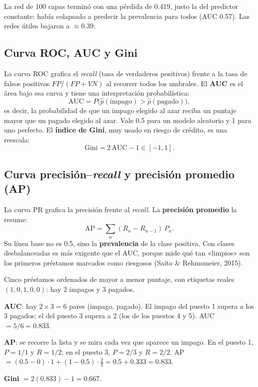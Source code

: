 \documentclass[11pt,a4paper]{article}
\begin{document}
\begin{proyecto}
La red de 100 capas terminó con una pérdida de 0.419, justo la del predictor constante: había colapsado a predecir la prevalencia para todos (AUC 0.57). Las redes útiles bajaron a $\approx 0.39$.
\end{proyecto}

\subsection{Curva ROC, AUC y Gini}

La curva ROC grafica el \textit{recall} (tasa de verdaderos positivos) frente a la tasa de falsos positivos $FP/(FP+VN)$ al recorrer todos los umbrales. El \textbf{AUC} es el área bajo esa curva y tiene una interpretación probabilística:
\begin{equation}
\text{AUC} = P\big(\hat p(\text{impago}) > \hat p(\text{pagado})\big),
\end{equation}
es decir, la probabilidad de que un impago elegido al azar reciba un puntaje mayor que un pagado elegido al azar. Vale 0.5 para un modelo aleatorio y 1 para uno perfecto. El \textbf{índice de Gini}, muy usado en riesgo de crédito, es una reescala:
\begin{equation}
\text{Gini} = 2\,\text{AUC} - 1 \in [-1, 1].
\end{equation}

\subsection{Curva precisión--\textit{recall} y precisión promedio (AP)}

La curva PR grafica la precisión frente al \textit{recall}. La \textbf{precisión promedio} la resume:
\begin{equation}
\text{AP} = \sum_n (R_n - R_{n-1})\,P_n .
\end{equation}
Su línea base no es 0.5, sino la \textbf{prevalencia} de la clase positiva. Con clases desbalanceadas es más exigente que el AUC, porque mide qué tan «limpios» son los primeros préstamos marcados como riesgosos (Saito \& Rehmsmeier, 2015).

\begin{ejemplo}
Cinco préstamos ordenados de mayor a menor puntaje, con etiquetas reales $(1,0,1,0,0)$: hay 2 impagos y 3 pagados.

\textbf{AUC}: hay $2\times3=6$ pares (impago, pagado). El impago del puesto 1 supera a los 3 pagados; el del puesto 3 supera a 2 (los de los puestos 4 y 5). AUC $=5/6=0.833$.

\textbf{AP}: se recorre la lista y se mira cada vez que aparece un impago.
En el puesto 1, $P=1/1$ y $R=1/2$; en el puesto 3, $P=2/3$ y $R=2/2$.
AP $=(0.5-0)\cdot 1 + (1-0.5)\cdot\tfrac23 = 0.5+0.333 = 0.833$.

\textbf{Gini} $=2(0.833)-1=0.667$.
\end{ejemplo}
\end{document}
